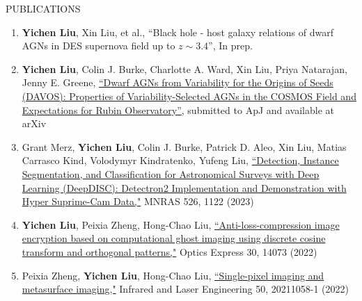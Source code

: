 \documentclass[11pt]{article} %
\begin{document}
\begin{section}{PUBLICATIONS}
\begin{enumerate}[leftmargin=1.5em]
    \item \label{inprep}\textbf{Yichen Liu}, Xin Liu, et al., ``Black hole - host galaxy relations of dwarf AGNs in DES supernova field up to $z\sim3.4$'', In prep.
    \item \label{apj} \textbf{Yichen Liu}, Colin J. Burke, Charlotte A. Ward, Xin Liu, Priya Natarajan, Jenny E. Greene, \href{https://arxiv.org/abs/2402.06882}{``Dwarf AGNs from Variability for the Origins of Seeds (DAVOS): Properties of Variability-Selected AGNs in the COSMOS Field and Expectations for Rubin Observatory''}, submitted to ApJ and available at arXiv
    \item \label{mnras} Grant Merz, \textbf{Yichen Liu}, Colin J. Burke, Patrick D. Aleo, Xin Liu, Matias Carrasco Kind, Volodymyr Kindratenko, Yufeng Liu, \href{https://academic.oup.com/mnras/advance-article-abstract/doi/10.1093/mnras/stad2785/7273850?redirectedFrom=fulltext}{``Detection, Instance Segmentation, and Classification for Astronomical Surveys with Deep Learning (DeepDISC): Detectron2 Implementation and Demonstration with Hyper Suprime-Cam Data,"} MNRAS 526, 1122 (2023)
    \item \label{oe} \textbf{Yichen Liu}, Peixia Zheng, Hong-Chao Liu, \href{https://opg.optica.org/oe/fulltext.cfm?uri=oe-30-9-14073&id=471300}{``Anti-loss-compression image encryption based on computational ghost imaging using discrete cosine transform and orthogonal patterns,"} Optics Express 30, 14073 (2022)
    \item \label{irla} Peixia Zheng, \textbf{Yichen Liu}, Hong-Chao Liu, \href{http://www.irla.cn/cn/article/doi/10.3788/IRLA20211058}{``Single-pixel imaging and metasurface imaging,"} Infrared and Laser Engineering 50, 20211058-1 (2022)  
\end{enumerate}

\end{section}
\end{document}
